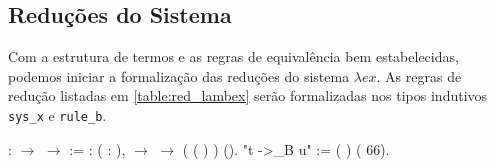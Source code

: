 \subsection{Reduções do Sistema}
\label{sub:redu_es_do_sistema}

Com a estrutura de termos e as regras de equivalência bem estabelecidas, podemos
iniciar a formalização das reduções do sistema $\lambda ex$.
As regras de redução listadas em  \ref{table:red_lambex} serão formalizadas nos
tipos indutivos \texttt{sys\_x} e \texttt{rule\_b}.

\bigskip
\coqdocnoindent {}  : 
\ensuremath{\rightarrow}  \ensuremath{\rightarrow}
 :=\coqdoceol \coqdocindent{1.50em}  :
\coqdockw{\ensuremath{\forall}} (
 : ),  
 \ensuremath{\rightarrow} 
 \ensuremath{\rightarrow}  \coqdoceol \coqdocindent{2.50em}
( (
) )
(\coqdocnotation{[}\coqdocnotation{]}).\coqdoceol
\coqdocnoindent
{} "t ->\_B u" :=
( 
) (  66).\coqdoceol

\medskip

